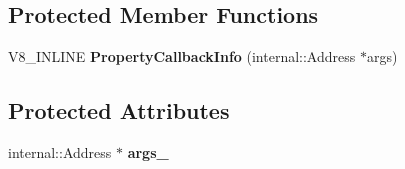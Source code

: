 \subsection*{Protected Member Functions}
\begin{DoxyCompactItemize}
\item 
\mbox{\label{classv8_1_1PropertyCallbackInfo_af1ab54236cc838166b2c3855488cb7ad}} 
V8\+\_\+\+I\+N\+L\+I\+NE {\bfseries Property\+Callback\+Info} (internal\+::\+Address $\ast$args)
\end{DoxyCompactItemize}
\subsection*{Protected Attributes}
\begin{DoxyCompactItemize}
\item 
\mbox{\label{classv8_1_1PropertyCallbackInfo_af78f4466d1014cb3304589570f2d1fce}} 
internal\+::\+Address $\ast$ {\bfseries args\+\_\+}
\end{DoxyCompactItemize}
